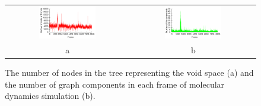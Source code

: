 \documentclass[usletter, 10pt, conference]{svjour3}      %
\begin{document}
\begin{figure}
\centering
{
\renewcommand{\tabcolsep}{0pt}
\begin{tabular}{cc}
\includegraphics[width=0.48\textwidth]{fig/probe14treeSize} &
\includegraphics[width=0.48\textwidth]{fig/probe14components}  \\
a & b  \\
\end{tabular}
}
\caption{\label{fig::treesize}
    The number of nodes in the tree representing the void space (a) and the number of graph components in each frame
        of molecular dynamics simulation (b).
}
\end{figure}
\end{document}
